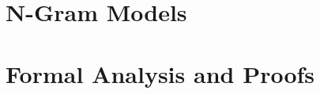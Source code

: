 \documentclass[11pt,letterpaper]{article}
\begin{document}
\section{N-Gram Models}






%
%
%
%
%
%


\section{Formal Analysis and Proofs}

\end{document}
